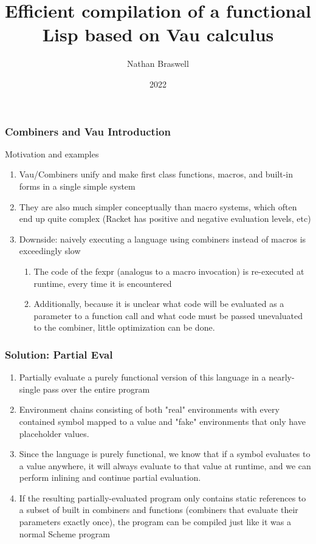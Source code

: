 \documentclass{beamer}
\title{Efficient compilation of a functional Lisp based on Vau calculus}
\author{Nathan Braswell}
\institute{Georgia Tech}
\date{2022}
\begin{document}
\frame{\titlepage}

\begin{frame}
\frametitle{Combiners and Vau Introduction}
Motivation and examples
  \begin{enumerate}
	\item<1-> Vau/Combiners unify and make first class functions, macros, and built-in forms in a single simple system
	\item<2-> They are also much simpler conceptually than macro systems, which often end up quite complex (Racket has positive and negative evaluation levels, etc)
	\item<3-> Downside: naively executing a language using combiners instead of macros is exceedingly slow
	\begin{enumerate}
		\item<4-> The code of the fexpr (analogus to a macro invocation) is re-executed at runtime, every time it is encountered
		\item<5-> Additionally, because it is unclear what code will be evaluated as a parameter to a function call and what code must be passed unevaluated to the combiner, little optimization can be done.
	\end{enumerate}
  \end{enumerate}
\end{frame}

\begin{frame}
\frametitle{Solution: Partial Eval}
  \begin{enumerate}
    \item<1-> Partially evaluate a purely functional version of this language in a nearly-single pass over the entire program
    \item<2-> Environment chains consisting of both "real" environments with every contained symbol mapped to a value and "fake" environments that only have placeholder values.
	\item<3-> Since the language is purely functional, we know that if a symbol evaluates to a value anywhere, it will always evaluate to that value at runtime, and we can perform inlining and continue partial evaluation.
	\item<4-> If the resulting partially-evaluated program only contains static references to a subset of built in combiners and functions (combiners that evaluate their parameters exactly once), the program can be compiled just like it was a normal Scheme program
  \end{enumerate}
\end{frame}
\end{document}

